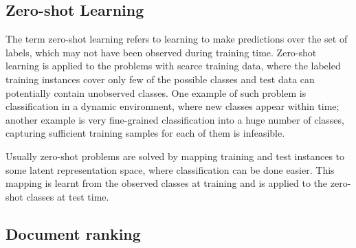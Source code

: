 \subsection{Zero-shot Learning}

The term zero-shot learning refers to learning to make predictions over the set of labels, which may not have been observed during training time. Zero-shot learning is applied to the problems with scarce training data, where the labeled training instances cover only few of the possible classes and test data can potentially contain unobserved classes. One example of such problem is classification in a dynamic environment, where new classes appear within time; another example is very fine-grained classification into a huge number of classes, capturing sufficient training samples for each of them is infeasible.

Usually zero-shot problems are solved by mapping training and test instances to some latent representation space, where classification can be done easier. This mapping is learnt from the observed classes at training and is applied to the zero-shot classes at test time. %



\subsection{Document ranking}

